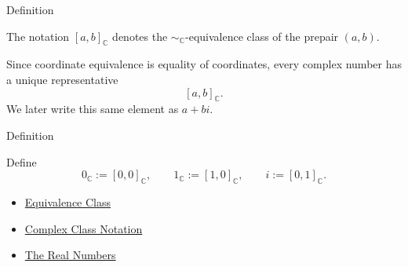 \begin{definitionbox}{Definition}
\begin{definition}
\label{def:complex-class-notation}
The notation $[a,b]_{\mathbb{C}}$ denotes the
\(\sim_{\mathbb{C}}\)-equivalence class of the prepair $(a,b)$.
\end{definition}
\end{definitionbox}

\begin{remark*}
Since coordinate equivalence is equality of coordinates, every complex number
has a unique representative
\[
[a,b]_{\mathbb{C}}.
\]
We later write this same element as $a+bi$.
\end{remark*}

\begin{definitionbox}{Definition}
\begin{definition}
\label{def:zero-one-i-in-c}
Define
\[
0_{\mathbb{C}}:=[0,0]_{\mathbb{C}},
\qquad
1_{\mathbb{C}}:=[1,0]_{\mathbb{C}},
\qquad
i:=[0,1]_{\mathbb{C}}.
\]
\end{definition}
\end{definitionbox}

\begin{dependencies}
\begin{itemize}
  \item \hyperref[def:equiv-class]{Equivalence Class}
  \item \hyperref[def:complex-class-notation]{Complex Class Notation}
  \item \hyperref[def:reals]{The Real Numbers}
\end{itemize}
\end{dependencies}
